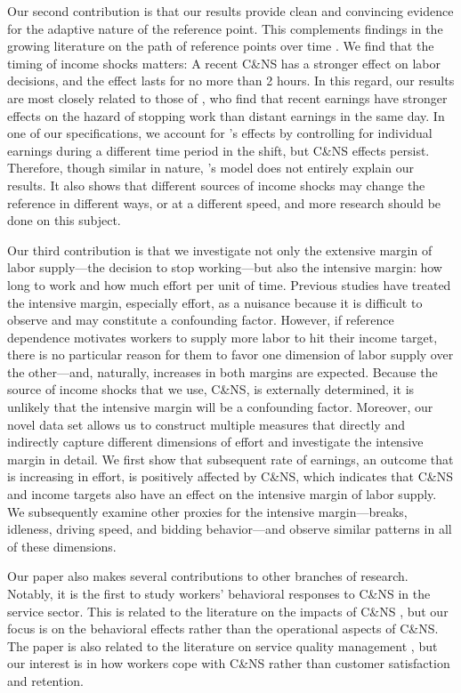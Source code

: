 \documentclass[reviewmode]{restud}
\begin{document}
Our second contribution is that our results provide clean and convincing evidence for the adaptive nature of the reference point. This complements findings in the growing literature on the path of reference points over time \citep{dellavigna2017reference,thakral2018daily}. We find that the timing of income shocks matters: A recent C\&NS has a stronger effect on labor decisions, and the effect lasts for no more than 2 hours. In this regard, our results are most closely related to those of \citet{thakral2018daily}, who find that recent earnings have stronger effects on the hazard of stopping work than distant earnings in the same day. In one of our specifications, we account for \citeauthor{thakral2018daily}'s effects by controlling for individual earnings during a different time period in the shift, but C\&NS effects persist. Therefore, though similar in nature, \citeauthor{thakral2018daily}'s model does not entirely explain our results. It also shows that different sources of income shocks may change the reference in different ways, or at a different speed, and more research should be done on this subject.

Our third contribution is that we investigate not only the extensive margin of labor supply---the decision to stop working---but also the intensive margin: how long to work and how much effort per unit of time. Previous studies have treated the intensive margin, especially effort, as a nuisance because it is difficult to observe and may constitute a confounding factor. However, if reference dependence motivates workers to supply more labor to hit their income target, there is no particular reason for them to favor one dimension of labor supply over the other---and, naturally, increases in both margins are expected. Because the source of income shocks that we use, C\&NS, is externally determined, it is unlikely that the intensive margin will be a confounding factor. Moreover, our novel data set allows us to construct multiple measures that directly and indirectly capture different dimensions of effort and investigate the intensive margin in detail. We first show that subsequent rate of earnings, an outcome that is increasing in effort, is positively affected by C\&NS, which indicates that C\&NS and income targets also have an effect on the intensive margin of labor supply. We subsequently examine other proxies for the intensive margin---breaks, idleness, driving speed, and bidding behavior---and observe similar patterns in all of these dimensions.

Our paper also makes several contributions to other branches of research. Notably, it is the first to study workers' behavioral responses to C\&NS in the service sector. This is related to the literature on the impacts of C\&NS \citep{moore2001time,patrick2008reducing,norris2014empirical,feldman2014appointment}, but our focus is on the behavioral effects rather than the operational aspects of C\&NS. The paper is also related to the literature on service quality management \citep{cohen2018frustration}, but our interest is in how workers cope with C\&NS rather than customer satisfaction and retention. 
\end{document}
